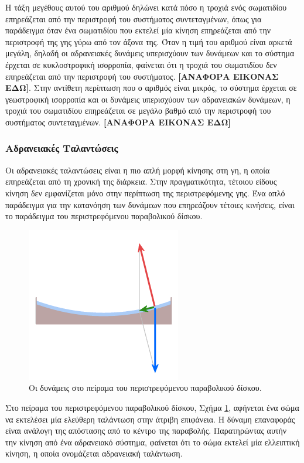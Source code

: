 Η τάξη μεγέθους αυτού του αριθμού δηλώνει κατά πόσο η τροχιά ενός σωματιδίου επηρεάζεται από την περιστροφή του συστήματος συντεταγμένων, όπως για παράδειγμα όταν ένα σωματιδίου που εκτελεί μία κίνηση επηρεάζεται από την περιστροφή της γης γύρω από τον άξονα της. Όταν η τιμή του αριθμού  είναι αρκετά μεγάλη, δηλαδή οι αδρανειακές δυνάμεις υπερισχύουν των δυνάμεων  και το σύστημα έρχεται σε κυκλοστροφική ισορροπία, φαίνεται ότι η τροχιά του σωματιδίου δεν επηρεάζεται από την περιστροφή του συστήματος. \textbf{[ΑΝΑΦΟΡΑ ΕΙΚΟΝΑΣ ΕΔΩ]}. Στην αντίθετη περίπτωση που ο αριθμός \ros είναι μικρός, το σύστημα έρχεται σε γεωστροφική ισορροπία και οι δυνάμεις \cor υπερισχύουν των αδρανειακών δυνάμεων, η τροχιά του σωματιδίου επηρεάζεται σε μεγάλο βαθμό από την περιστροφή του συστήματος συντεταγμένων. \textbf{[ΑΝΑΦΟΡΑ ΕΙΚΟΝΑΣ ΕΔΩ]}

\subsubsection{Αδρανειακές Ταλαντώσεις}
Οι αδρανειακές ταλαντώσεις είναι η πιο απλή μορφή κίνησης στη γη, η οποία επηρεάζεται από τη χρονική της διάρκεια. Στην πραγματικότητα, τέτοιου είδους κίνηση δεν εμφανίζεται μόνο στην περίπτωση της περιστρεφόμενης γης. Ένα απλό παράδειγμα για την κατανόηση των δυνάμεων που επηρεάζουν τέτοιες κινήσεις, είναι το παράδειγμα του περιστρεφόμενου παραβολικού δίσκου.
\begin{figure}[ht]
	\centering
	\includegraphics[scale=0.7]{images/coriolis-parabolic-disk.png}
	\caption{Οι δυνάμεις στο πείραμα του περιστρεφόμενου παραβολικού δίσκου. }
	\label{fig:coriolis-parbolic-disk}
\end{figure}

Στο πείραμα του περιστρεφόμενου παραβολικού δίσκου, Σχήμα \ref{fig:coriolis-parbolic-disk}, αφήνεται ένα σώμα να εκτελέσει μία ελεύθερη ταλάντωση στην άτριβη επιφάνεια. Η δύναμη επαναφοράς είναι ανάλογη της απόστασης από το κέντρο της παραβολής. Παρατηρώντας αυτήν την κίνηση από ένα αδρανειακό σύστημα, φαίνεται ότι το σώμα εκτελεί μία ελλειπτική κίνηση, η οποία ονομάζεται αδρανειακή ταλάντωση.

